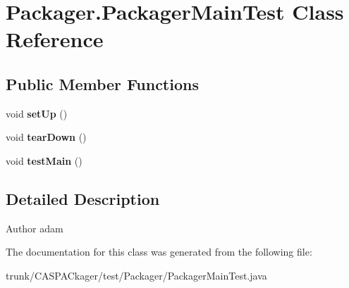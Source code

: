 \hypertarget{classPackager_1_1PackagerMainTest}{\section{Packager.\-Packager\-Main\-Test Class Reference}
\label{classPackager_1_1PackagerMainTest}
}
\subsection*{Public Member Functions}
\begin{DoxyCompactItemize}
\item 
\hypertarget{classPackager_1_1PackagerMainTest_af8578d165f81c09371983443aa8d0155}{void {\bfseries set\-Up} ()}\label{classPackager_1_1PackagerMainTest_af8578d165f81c09371983443aa8d0155}

\item 
\hypertarget{classPackager_1_1PackagerMainTest_ae425a28b4b0e0852f417d36f88bb859f}{void {\bfseries tear\-Down} ()}\label{classPackager_1_1PackagerMainTest_ae425a28b4b0e0852f417d36f88bb859f}

\item 
\hypertarget{classPackager_1_1PackagerMainTest_a6c024845bdb339b04c99b75be6f3a6d7}{void {\bfseries test\-Main} ()}\label{classPackager_1_1PackagerMainTest_a6c024845bdb339b04c99b75be6f3a6d7}

\end{DoxyCompactItemize}


\subsection{Detailed Description}
\begin{DoxyAuthor}{Author}
adam 
\end{DoxyAuthor}


The documentation for this class was generated from the following file\-:\begin{DoxyCompactItemize}
\item 
trunk/\-C\-A\-S\-P\-A\-Ckager/test/\-Packager/Packager\-Main\-Test.\-java\end{DoxyCompactItemize}
